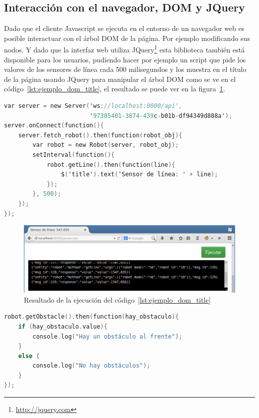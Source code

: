 \subsection{Interacción con el navegador, DOM y JQuery}

Dado que el cliente Javascript se ejecuta en el entorno de un navegador web es posible
interactuar con el árbol DOM de la página. Por ejemplo modificando sus nodos.
Y dado que la interfaz web utiliza
JQuery\footnote{\url{http://jquery.com}}
esta biblioteca también está disponible
para los usuarios, pudiendo hacer por ejemplo un script que pide los valores
de los sensores de línea cada 500 milisegundos y los muestra en el título de la
página usando JQuery para manipular el árbol DOM como se ve en el
código~\ref{lst:ejemplo_dom_title}, el resultado se puede ver en la
figura~\ref{fig:ejemplo_web_sensor}.

\begin{lstlisting}[language=C,
caption={Manipulación de DOM con JQuery desde
XRemoteBot para Javascript},
label={lst:ejemplo_dom_title}]
var server = new Server('ws://localhost:8000/api',
                        '97385401-3874-439c-b01b-df94349d888a');
server.onConnect(function(){
    server.fetch_robot().then(function(robot_obj){
        var robot = new Robot(server, robot_obj);
        setInterval(function(){
            robot.getLine().then(function(line){
                $('title').text('Sensor de línea: ' + line);
            });
        }, 500);
    });
});
\end{lstlisting}

\begin{figure}
    \centering
    \includegraphics[width=1\textwidth]{figures/ejemplo_web_sensor}
    \caption{Resultado de la ejecución del código~\ref{lst:ejemplo_dom_title}}
    \label{fig:ejemplo_web_sensor}
\end{figure}

\begin{lstlisting}[language=C,
caption={Implementación de \texttt{getObstacle()} con ``promesas''},
label=lst:promises_get_obstacle]
robot.getObstacle().then(function(hay_obstaculo){
    if (hay_obstaculo.value){
        console.log("Hay un obstáculo al frente");
    }
    else {
        console.log("No hay obstáculos");
    }
});
\end{lstlisting}

